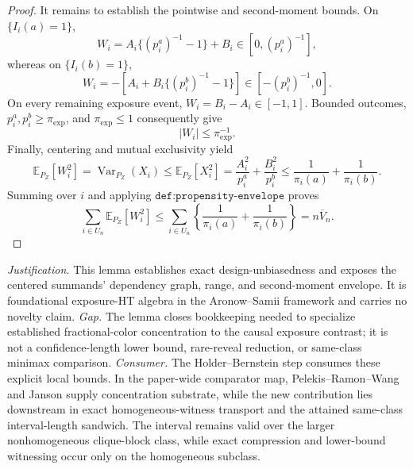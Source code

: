 \documentclass{article}
\begin{document}
\begin{proof}
It remains to establish the pointwise and second-moment bounds. On \(\{I_i(a)=1\}\),
\[
W_i=A_i\{(p_i^a)^{-1}-1\}+B_i\in[0,(p_i^a)^{-1}],
\]
whereas on \(\{I_i(b)=1\}\),
\[
W_i=-\left[A_i+B_i\{(p_i^b)^{-1}-1\}\right]
\in[-(p_i^b)^{-1},0].
\]
On every remaining exposure event, \(W_i=B_i-A_i\in[-1,1]\). Bounded outcomes, \(p_i^a,p_i^b\ge\pi_{\exp}\), and \(\pi_{\exp}\le1\) consequently give
\[
|W_i|\le\pi_{\exp}^{-1}.
\]
Finally, centering and mutual exclusivity yield
\[
\mathbb E_{P_Z}[W_i^2]
=\operatorname{Var}_{P_Z}(X_i)
\le \mathbb E_{P_Z}[X_i^2]
=\frac{A_i^2}{p_i^a}+\frac{B_i^2}{p_i^b}
\le\frac1{\pi_i(a)}+\frac1{\pi_i(b)}.
\]
Summing over \(i\) and applying \(\texttt{def:propensity-envelope}\) proves
\[
\sum_{i\in U_n}\mathbb E_{P_Z}[W_i^2]
\le\sum_{i\in U_n}\left\{\frac1{\pi_i(a)}+\frac1{\pi_i(b)}\right\}
=n\overline V_n.
\]
\end{proof}
\par\smallskip\noindent \textit{Justification.} This lemma establishes exact design-unbiasedness and exposes the centered summands' dependency graph, range, and second-moment envelope. It is foundational exposure-HT algebra in the Aronow--Samii framework and carries no novelty claim. \textit{Gap.} The lemma closes bookkeeping needed to specialize established fractional-color concentration to the causal exposure contrast; it is not a confidence-length lower bound, rare-reveal reduction, or same-class minimax comparison. \textit{Consumer.} The Holder--Bernstein step consumes these explicit local bounds. In the paper-wide comparator map, Pelekis--Ramon--Wang and Janson supply concentration substrate, while the new contribution lies downstream in exact homogeneous-witness transport and the attained same-class interval-length sandwich. The interval remains valid over the larger nonhomogeneous clique-block class, while exact compression and lower-bound witnessing occur only on the homogeneous subclass.
\end{document}
